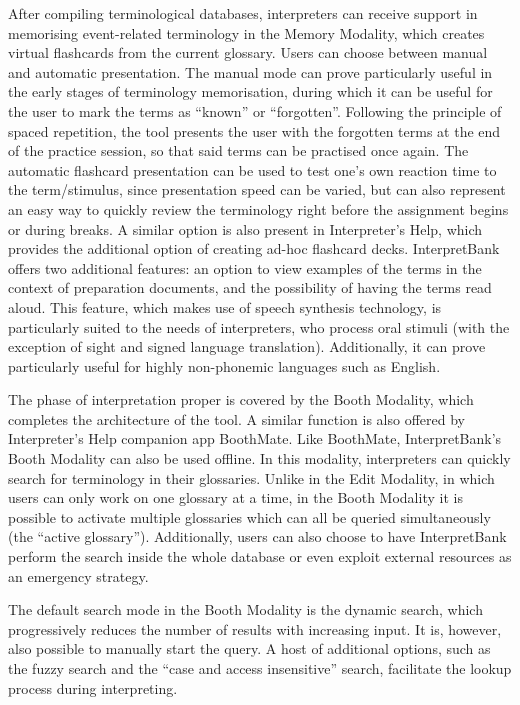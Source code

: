 After compiling terminological databases, interpreters can receive support in memorising event-related terminology in the Memory Modality, which creates virtual flashcards from the current glossary. Users can choose between manual and automatic presentation. The manual mode can prove particularly useful in the early stages of terminology memorisation, during which it can be useful for the user to mark the terms as ``known'' or ``forgotten''. Following the principle of spaced repetition, the tool presents the user with the forgotten terms at the end of the practice session, so that said terms can be practised once again. The automatic flashcard presentation can be used to test one's own reaction time to the term/stimulus, since presentation speed can be varied, but can also represent an easy way to quickly review the terminology right before the assignment begins or during breaks. A similar option is also present in Interpreter's Help, which provides the additional option of creating ad-hoc flashcard decks. InterpretBank offers two additional features: an option to view examples of the terms in the context of preparation documents, and the possibility of having the terms read aloud. This feature, which makes use of speech synthesis technology, is particularly suited to the needs of interpreters, who process oral stimuli (with the exception of sight and signed language translation). Additionally, it can prove particularly useful for highly non-phonemic languages such as English.

The phase of interpretation proper is covered by the Booth Modality, which completes the architecture of the tool. A similar function is also offered by Interpreter's Help companion app BoothMate. Like BoothMate, InterpretBank's Booth Modality can also be used offline. In this modality, interpreters can quickly search for terminology in their glossaries. Unlike in the Edit Modality, in which users can only work on one glossary at a time, in the Booth Modality it is possible to activate multiple glossaries which can all be queried simultaneously (the ``active glossary''). Additionally, users can also choose to have InterpretBank perform the search inside the whole database or even exploit external resources as an emergency strategy.

The default search mode in the Booth Modality is the dynamic search, which progressively reduces the number of results with increasing input. It is, however, also possible to manually start the query. A host of additional options, such as the fuzzy search and the ``case and access insensitive'' search, facilitate the lookup process during interpreting. 

